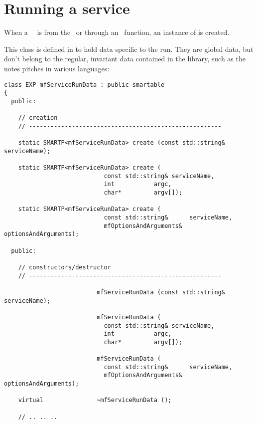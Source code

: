 \section{Running a service}

When a \mf\ \service\ is  from the \CLI\ or through an \API\ function, an instance of  is created.

This class   is defined in  to hold data specific to the run. They are global data, but don't belong to the regular, invariant data contained in the library, such as the notes pitches in various languages: %
\begin{lstlisting}[language=CPlusPlus]
class EXP mfServiceRunData : public smartable
{
  public:

    // creation
    // ------------------------------------------------------

    static SMARTP<mfServiceRunData> create (const std::string& serviceName);

    static SMARTP<mfServiceRunData> create (
                            const std::string& serviceName,
                            int           argc,
                            char*         argv[]);

    static SMARTP<mfServiceRunData> create (
                            const std::string&      serviceName,
                            mfOptionsAndArguments& optionsAndArguments);

  public:

    // constructors/destructor
    // ------------------------------------------------------

                          mfServiceRunData (const std::string& serviceName);

                          mfServiceRunData (
                            const std::string& serviceName,
                            int           argc,
                            char*         argv[]);

                          mfServiceRunData (
                            const std::string&      serviceName,
                            mfOptionsAndArguments& optionsAndArguments);

    virtual               ~mfServiceRunData ();

	// .. .. ..


\end{lstlisting}
